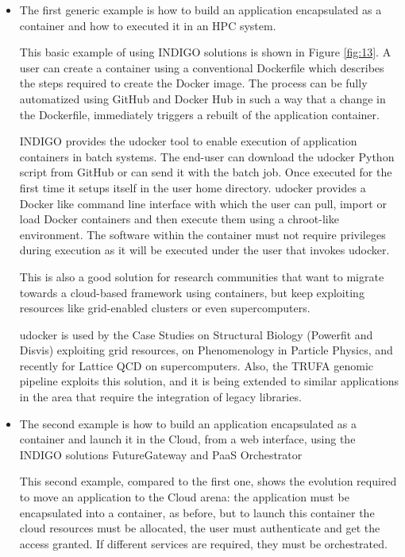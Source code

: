 \documentclass{article}
\begin{document}
{\begin{itemize}

\item The first generic example is how to build an application encapsulated as a container and how to executed it in an HPC system.

This basic example of using INDIGO solutions is shown in Figure \ref{fig:13}. A user can create a container using a conventional Dockerfile which describes the steps required to create the Docker image. The process can be fully automatized using GitHub and Docker Hub in such a way that a change in the Dockerfile, immediately triggers a rebuilt of the application container.

INDIGO provides the udocker tool to enable execution of application containers in batch systems. The end-user can download the udocker Python script from GitHub or can send it with the batch job. Once executed for the first time it setups itself in the user home directory. udocker provides a Docker like command line interface with which the user can pull, import or load Docker containers and then execute them using a chroot-like environment. The software within the container must not require privileges during execution as it will be executed under the user that invokes udocker.


This is also a good solution for research communities that want to migrate towards a cloud-based framework using containers, but keep exploiting resources like grid-enabled clusters or even supercomputers. 

udocker is used by the Case Studies on Structural Biology (Powerfit and Disvis) exploiting grid resources, on Phenomenology in Particle Physics, and recently for Lattice QCD on supercomputers. Also, the TRUFA genomic pipeline exploits this solution, and it is being extended to similar applications in the area that require the integration of legacy libraries. 


\item The second example is how to build an application encapsulated as a container and launch it in the Cloud, from a web interface, using the INDIGO solutions FutureGateway and PaaS Orchestrator

This second example, compared to the first one, shows the evolution required to move an application to the Cloud arena: the application must be encapsulated into a container, as before, but to launch this container the cloud resources must be allocated, the user must authenticate and get the access granted. If different services are required, they must be orchestrated.



\end{itemize}}
\end{document}
